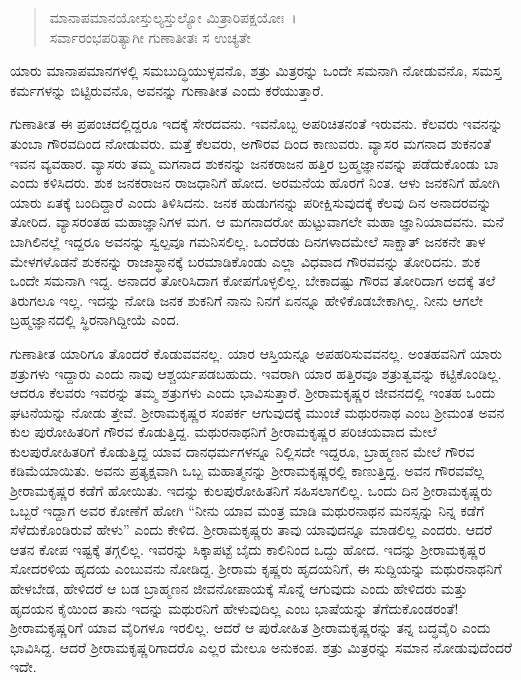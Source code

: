 \begin{verse}
ಮಾನಾಪಮಾನಯೋಸ್ತುಲ್ಯಸ್ತುಲ್ಯೋ ಮಿತ್ರಾರಿಪಕ್ಷಯೋಃ~।\\ಸರ್ವಾರಂಭಪರಿತ್ಯಾಗೀ ಗುಣಾತೀತಃ ಸ ಉಚ್ಯತೇ 
\end{verse}

{\small ಯಾರು ಮಾನಾಪಮಾನಗಳಲ್ಲಿ ಸಮಬುದ್ಧಿಯುಳ್ಳವನೊ, ಶತ್ರು ಮಿತ್ರರನ್ನು ಒಂದೇ ಸಮನಾಗಿ ನೋಡುವನೊ, ಸಮಸ್ತ ಕರ್ಮಗಳನ್ನು ಬಿಟ್ಟಿರುವನೊ, ಅವನನ್ನು ಗುಣಾತೀತ ಎಂದು ಕರೆಯುತ್ತಾರೆ.}

ಗುಣಾತೀತ ಈ ಪ್ರಪಂಚದಲ್ಲಿದ್ದರೂ ಇದಕ್ಕೆ ಸೇರದವನು. ಇವನೊಬ್ಬ ಅಪರಿಚಿತನಂತೆ ಇರುವನು. ಕೆಲವರು ಇವನನ್ನು ತುಂಬಾ ಗೌರವದಿಂದ ನೋಡುವರು. ಮತ್ತೆ ಕೆಲವರು, ಅಗೌರವ ದಿಂದ ಕಾಣುವರು. ವ್ಯಾಸರ ಮಗನಾದ ಶುಕನಂತೆ ಇವನ ವ್ಯವಹಾರ. ವ್ಯಾಸರು ತಮ್ಮ ಮಗನಾದ ಶುಕನನ್ನು ಜನಕರಾಜನ ಹತ್ತಿರ ಬ್ರಹ್ಮಜ್ಞಾನವನ್ನು ಪಡೆದುಕೊಂಡು ಬಾ ಎಂದು ಕಳಿಸಿದರು. ಶುಕ ಜನಕರಾಜನ ರಾಜಧಾನಿಗೆ ಹೋದ. ಅರಮನೆಯ ಹೊರಗೆ ನಿಂತ. ಆಳು ಜನಕನಿಗೆ ಹೋಗಿ ಯಾರು ಏತಕ್ಕೆ ಬಂದಿದ್ದಾರೆ ಎಂದು ತಿಳಿಸಿದನು. ಜನಕ ಹುಡುಗನನ್ನು ಪರೀಕ್ಷಿಸುವುದಕ್ಕೆ ಕೆಲವು ದಿನ ಅನಾದರವನ್ನು ತೋರಿದ. ವ್ಯಾಸರಂತಹ ಮಹಾಜ್ಞಾನಿಗಳ ಮಗ. ಆ ಮಗನಾದರೋ ಹುಟ್ಟುವಾಗಲೇ ಮಹಾ ಜ್ಞಾನಿಯಾದವನು. ಮನೆ ಬಾಗಿಲಿನಲ್ಲೆ ಇದ್ದರೂ ಅವನನ್ನು ಸ್ವಲ್ಪವೂ ಗಮನಿಸಲಿಲ್ಲ. ಒಂದೆರಡು ದಿನಗಳಾದಮೇಲೆ ಸಾಕ್ಷಾತ್ ಜನಕನೇ ತಾಳ ಮೇಳಗಳೊಡನೆ ಶುಕನನ್ನು ರಾಜಾಸ್ಥಾನಕ್ಕೆ ಬರಮಾಡಿಕೊಂಡು ಎಲ್ಲಾ ವಿಧವಾದ ಗೌರವವನ್ನು ತೋರಿದನು. ಶುಕ ಒಂದೇ ಸಮನಾಗಿ ಇದ್ದ. ಅನಾದರ ತೋರಿಸಿದಾಗ ಕೋಪಗೊಳ್ಳಲಿಲ್ಲ. ಬೇಕಾದಷ್ಟು ಗೌರವ ತೋರಿದಾಗ ಅದಕ್ಕೆ ತಲೆ ತಿರುಗಲೂ ಇಲ್ಲ. ಇದನ್ನು ನೋಡಿ ಜನಕ ಶುಕನಿಗೆ ನಾನು ನಿನಗೆ ಏನನ್ನೂ ಹೇಳಿಕೊಡಬೇಕಾಗಿಲ್ಲ. ನೀನು ಆಗಲೇ ಬ್ರಹ್ಮಜ್ಞಾನದಲ್ಲಿ ಸ್ಥಿರನಾಗಿದ್ದೀಯೆ ಎಂದ.

ಗುಣಾತೀತ ಯಾರಿಗೂ ತೊಂದರೆ ಕೊಡುವವನಲ್ಲ. ಯಾರ ಆಸ್ತಿಯನ್ನೂ ಅಪಹರಿಸುವವನಲ್ಲ. ಅಂತಹವನಿಗೆ ಯಾರು ಶತ್ರುಗಳು ಇದ್ದಾರು ಎಂದು ನಾವು ಆಶ್ಚರ್ಯಪಡಬಹುದು. ಇವರಾಗಿ ಯಾರ ಹತ್ತಿರವೂ ಶತ್ರುತ್ವವನ್ನು ಕಟ್ಟಿಕೊಂಡಿಲ್ಲ. ಆದರೂ ಕೆಲವರು ಇವರನ್ನು ತಮ್ಮ ಶತ್ರುಗಳು ಎಂದು ಭಾವಿಸುತ್ತಾರೆ. ಶ‍್ರೀರಾಮಕೃಷ್ಣರ ಜೀವನದಲ್ಲಿ ಇಂತಹ ಒಂದು ಘಟನೆಯನ್ನು ನೋಡು ತ್ತೇವೆ. ಶ‍್ರೀರಾಮಕೃಷ್ಣರ ಸಂಪರ್ಕ ಆಗುವುದಕ್ಕೆ ಮುಂಚೆ ಮಥುರನಾಥ ಎಂಬ ಶ‍್ರೀಮಂತ ಅವನ ಕುಲ ಪುರೋಹಿತರಿಗೆ ಗೌರವ ಕೊಡುತ್ತಿದ್ದ. ಮಥುರನಾಥನಿಗೆ ಶ‍್ರೀರಾಮಕೃಷ್ಣರ ಪರಿಚಯವಾದ ಮೇಲೆ ಕುಲಪುರೋಹಿತರಿಗೆ ಕೊಡುತ್ತಿದ್ದ ಯಾವ ದಾನಧರ್ಮಗಳನ್ನೂ ನಿಲ್ಲಿಸದೇ ಇದ್ದರೂ, ಬ್ರಾಹ್ಮಣನ ಮೇಲೆ ಗೌರವ ಕಡಿಮೆಯಾಯಿತು. ಅವನು ಪ್ರತ್ಯಕ್ಷವಾಗಿ ಒಬ್ಬ ಮಹಾತ್ಮನನ್ನು ಶ‍್ರೀರಾಮಕೃಷ್ಣರಲ್ಲಿ ಕಾಣುತ್ತಿದ್ದ. ಅವನ ಗೌರವವೆಲ್ಲ ಶ‍್ರೀರಾಮಕೃಷ್ಣರ ಕಡೆಗೆ ಹೋಯಿತು. ಇದನ್ನು ಕುಲಪುರೋಹಿತನಿಗೆ ಸಹಿಸಲಾಗಲಿಲ್ಲ. ಒಂದು ದಿನ ಶ‍್ರೀರಾಮಕೃಷ್ಣರು ಒಬ್ಬರೆ ಇದ್ದಾಗ ಅವರ ಕೋಣೆಗೆ ಹೋಗಿ “ನೀನು ಯಾವ ಮಂತ್ರ ಮಾಡಿ ಮಥುರನಾಥನ ಮನಸ್ಸನ್ನು ನಿನ್ನ ಕಡೆಗೆ ಸೆಳೆದುಕೊಂಡಿರುವೆ ಹೇಳು” ಎಂದು ಕೇಳಿದ. ಶ‍್ರೀರಾಮಕೃಷ್ಣರು ತಾವು ಯಾವುದನ್ನೂ ಮಾಡಲಿಲ್ಲ ಎಂದರು. ಆದರೆ ಆತನ ಕೋಪ ಇಷ್ಟಕ್ಕೆ ತಗ್ಗಲಿಲ್ಲ. ಇವರನ್ನು ಸಿಕ್ಕಾಪಟ್ಟೆ ಬೈದು ಕಾಲಿನಿಂದ ಒದ್ದು ಹೋದ. ಇದನ್ನು ಶ‍್ರೀರಾಮಕೃಷ್ಣರ ಸೋದರಳಿಯ ಹೃದಯ ಎಂಬುವನು ನೋಡಿದ್ದ. ಶ‍್ರೀರಾಮ ಕೃಷ್ಣರು ಹೃದಯನಿಗೆ, ಈ ಸುದ್ದಿಯನ್ನು ಮಥುರನಾಥನಿಗೆ ಹೇಳಬೇಡ, ಹೇಳಿದರೆ ಆ ಬಡ ಬ್ರಾಹ್ಮಣನ ಜೀವನೋಪಾಯಕ್ಕೆ ಸೊನ್ನೆ ಆಗುವುದು ಎಂದು ಹೇಳಿದರು ಮತ್ತು ಹೃದಯನ ಕೈಯಿಂದ ತಾನು ಇದನ್ನು ಮಥುರನಿಗೆ ಹೇಳುವುದಿಲ್ಲ ಎಂಬ ಭಾಷೆಯನ್ನು ತೆಗೆದುಕೊಂಡರಂತೆ! ಶ‍್ರೀರಾಮಕೃಷ್ಣರಿಗೆ ಯಾವ ವೈರಿಗಳೂ ಇರಲಿಲ್ಲ. ಆದರೆ ಆ ಪುರೋಹಿತ ಶ‍್ರೀರಾಮಕೃಷ್ಣರನ್ನು ತನ್ನ ಬದ್ಧವೈರಿ ಎಂದು ಭಾವಿಸಿದ್ದ. ಆದರೆ ಶ‍್ರೀರಾಮಕೃಷ್ಣರಿಗಾದರೊ ಎಲ್ಲರ ಮೇಲೂ ಅನುಕಂಪ. ಶತ್ರು ಮಿತ್ರರನ್ನು ಸಮಾನ ನೋಡುವುದೆಂದರೆ ಇದೇ.

